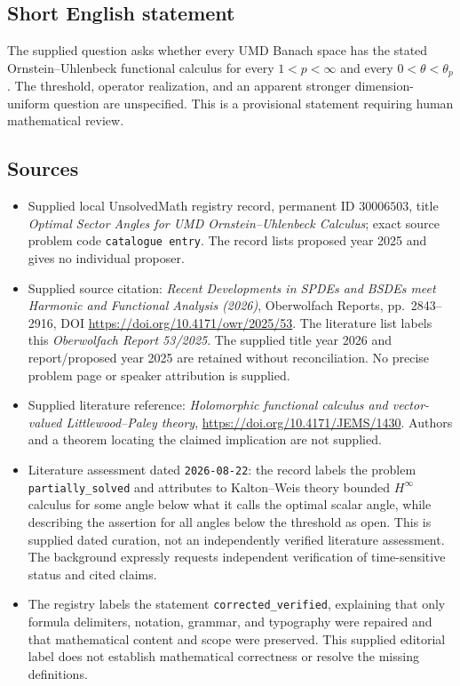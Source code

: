 \documentclass[11pt]{article}
\begin{document}
\subsection{Short English statement}
The supplied question asks whether every UMD Banach space has the stated Ornstein--Uhlenbeck functional calculus for every \(1<p<\infty\) and every \(0<\theta<\theta_p\). The threshold, operator realization, and an apparent stronger dimension-uniform question are unspecified. This is a provisional statement requiring human mathematical review.
\subsection{Sources}
\begin{itemize}
\item Supplied local UnsolvedMath registry record, permanent ID \(30006503\), title \emph{Optimal Sector Angles for UMD Ornstein--Uhlenbeck Calculus}; exact source problem code \texttt{catalogue entry}. The record lists proposed year 2025 and gives no individual proposer.
\item Supplied source citation: \emph{Recent Developments in SPDEs and BSDEs meet Harmonic and Functional Analysis (2026)}, Oberwolfach Reports, pp.\ 2843--2916, DOI \url{https://doi.org/10.4171/owr/2025/53}. The literature list labels this \emph{Oberwolfach Report 53/2025}. The supplied title year 2026 and report/proposed year 2025 are retained without reconciliation. No precise problem page or speaker attribution is supplied.
\item Supplied literature reference: \emph{Holomorphic functional calculus and vector-valued Littlewood--Paley theory}, \url{https://doi.org/10.4171/JEMS/1430}. Authors and a theorem locating the claimed implication are not supplied.
\item Literature assessment dated \texttt{2026-08-22}: the record labels the problem \texttt{partially\_solved} and attributes to Kalton--Weis theory bounded \(H^\infty\) calculus for some angle below what it calls the optimal scalar angle, while describing the assertion for all angles below the threshold as open. This is supplied dated curation, not an independently verified literature assessment. The background expressly requests independent verification of time-sensitive status and cited claims.
\item The registry labels the statement \texttt{corrected\_verified}, explaining that only formula delimiters, notation, grammar, and typography were repaired and that mathematical content and scope were preserved. This supplied editorial label does not establish mathematical correctness or resolve the missing definitions.
\end{itemize}
\end{document}
